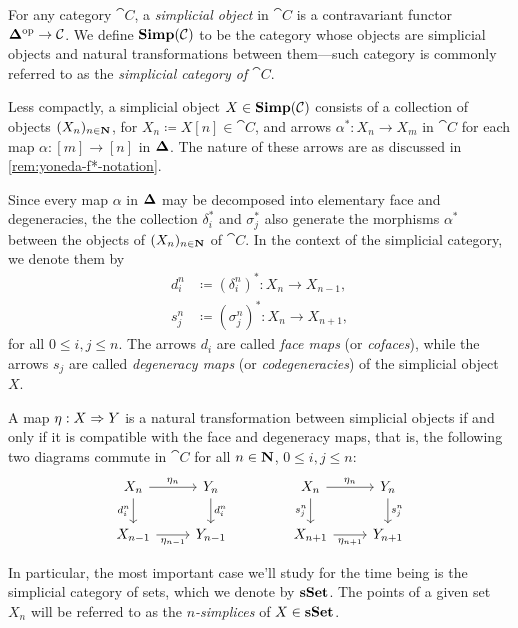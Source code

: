 \begin{definition}
\label{def:simplicial-object}
For any category \(\cat C\), a \emph{simplicial object} in \(\cat C\) is a
contravariant functor \({\mathbf{\Delta}}^{\mathrm{op}} \to \mathcal C\). We define \({\textbf{Simp}(\mathcal C)}\) to
be the category whose objects are simplicial objects and natural transformations
between them---such category is commonly referred to as the \emph{simplicial
  category of \(\cat C\)}.

Less compactly, a simplicial object \(X \in {\textbf{Simp}(\mathcal C)}\) consists of a
collection of objects \((X_n)_{n \in \mathbf{N}}\), for
\(X_n \coloneq X [n] \in \cat C\), and arrows \(\alpha^{*}: X_n \to X_m\) in
\(\cat C\) for each map \(\alpha: [m] \to [n]\) in \({\mathbf{\Delta}}\). The nature of
these arrows are as discussed in \cref{rem:yoneda-f*-notation}.

Since every map \(\alpha\) in \({\mathbf{\Delta}}\) may be decomposed into elementary face
and degeneracies, the the collection \(\delta_i^{*}\) and \(\sigma_j^{*}\) also
generate the morphisms \(\alpha^{*}\) between the objects of
\((X_n)_{n \in \mathbf{N}}\) of \(\cat C\). In the context of the simplicial category,
we denote them by
\begin{align*}
  d_i^n &\coloneq (\delta_i^n)^{*}: X_n \longrightarrow X_{n-1}, \\
  s_j^n &\coloneq (\sigma_j^n)^{*}: X_n \longrightarrow X_{n+1},
\end{align*}
for all \(0 \leq i, j \leq n\). The arrows \(d_i\) are called \emph{face maps}
(or \emph{cofaces}), while the arrows \(s_j\) are called \emph{degeneracy maps}
(or \emph{codegeneracies}) of the simplicial object \(X\).

A map \(\eta: X \Rightarrow Y\) is a natural transformation between simplicial objects
if and only if it is compatible with the face and degeneracy maps, that is, the
following two diagrams commute in \(\cat C\) for all \(n \in \mathbf{N}\),
\(0 \leq i, j\leq n\):
\[
\begin{tikzcd}
X_n \ar[r, "\eta_n"] \ar[d, "d_i^n"'] &Y_n \ar[d, "d_i^n"] \\
X_{n-1} \ar[r, "\eta_{n-1}"'] &Y_{n-1}
\end{tikzcd}
\qquad
\qquad
\begin{tikzcd}
X_n \ar[r, "\eta_n"] \ar[d, "s_j^n"'] &Y_n \ar[d, "s_j^n"] \\
X_{n+1} \ar[r, "\eta_{n+1}"'] &Y_{n+1}
\end{tikzcd}
\]

In particular, the most important case we'll study for the time being is the
simplicial category of sets, which we denote by \({\textbf{sSet}}\). The points of a
given set \(X_n\) will be referred to as the \emph{\(n\)-simplices} of
\(X \in {\textbf{sSet}}\).
\end{definition}

